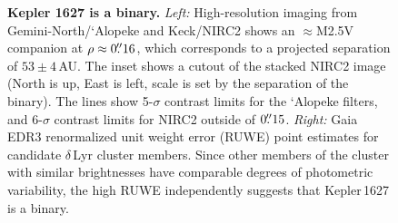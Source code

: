 \documentclass[12pt,modern,twocolumn,tighten]{aastex63}
\begin{document}
\begin{figure}[tp]
	\begin{center}
		\leavevmode
	\end{center}
	\vspace{-0.5cm}
	\caption{
    {\bf Kepler 1627 is a binary.} {\it Left:} High-resolution imaging
    from Gemini-North/`Alopeke and Keck/NIRC2 shows an $\approx$M2.5V
    companion at $\rho \approx 0\mbox{$.\!\!^{\prime\prime}$}16$, which corresponds to a
    projected separation of $53\pm4$\,AU.  The inset shows a cutout of
    the stacked NIRC2 image (North is up, East is left, scale is set
    by the separation of the binary).  The lines show 5-$\sigma$
    contrast limits for the `Alopeke filters, and 6-$\sigma$ contrast
    limits for NIRC2 outside of $0\mbox{$.\!\!^{\prime\prime}$}15$. {\it Right:} Gaia EDR3
    renormalized unit weight error (RUWE) point estimates for
    candidate $\delta$\,Lyr cluster members.  Since other members of
    the cluster with similar brightnesses have comparable degrees of
    photometric variability, the high RUWE independently suggests that
    Kepler\,1627 is a binary. 
    \label{fig:kep1627binary}
	}
\end{figure}
\end{document}
